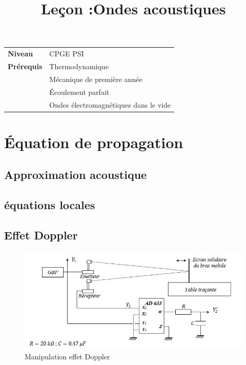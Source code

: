 \documentclass[10pt]{beamer}
\title{Leçon :Ondes acoustiques}
\begin{document}
\begin{frame}{}
    \titlepage

    \begin{tabularx}{\textwidth}{l@{:\,\,}X}
        \textbf{Niveau} 	  & CPGE PSI\\
        \textbf{Prérequis} & Thermodynamique \\
        & Mécanique de première année \\
        & Écoulement parfait \\
        & Ondes électromagnétiques dans le vide \\
        
    \end{tabularx}
\end{frame}

\begin{frame}
    \tableofcontents
\end{frame}
\section{Équation de propagation}
\subsection{Approximation acoustique}
\subsection{équations locales}
\subsection{Effet Doppler}

\begin{frame}{\insertsubsection}
    \begin{figure}
        \centering
        \includegraphics[width=1\textwidth]{EffetDoppler.png}
        \caption{Manipulation effet Doppler}
    \end{figure}

\end{frame}
    
\end{document}
